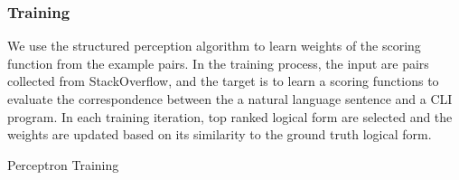 \subsubsection{Training}
\label{subsec:training}

We use the structured perception algorithm to learn weights of the scoring function from the example pairs. In the training process, the input are pairs collected from StackOverflow, and the target is to learn a scoring functions to evaluate the correspondence between the a natural language sentence and a CLI program. In each training iteration, top ranked logical form are selected and the weights are updated based on its similarity to the ground truth logical form. 

\begin{algorithm} 
\label{alg:training}
\caption{Perceptron Training}
\end{algorithm}
